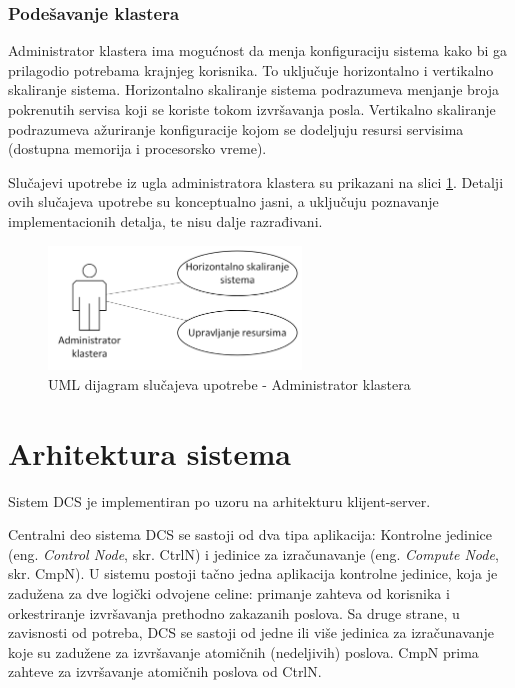 \documentclass[12pt,oneside]{memoir}
\begin{document}
\subsubsection{Podešavanje klastera}
Administrator klastera ima mogućnost da menja konfiguraciju sistema kako bi ga prilagodio potrebama krajnjeg korisnika. To uključuje horizontalno i vertikalno skaliranje sistema. Horizontalno skaliranje sistema podrazumeva menjanje broja pokrenutih servisa koji se koriste tokom izvršavanja posla. Vertikalno skaliranje podrazumeva ažuriranje konfiguracije kojom se dodeljuju resursi servisima (dostupna memorija i procesorsko vreme).

Slučajevi upotrebe iz ugla administratora klastera su prikazani na slici \ref{fig:slucajupotrebe_admin_klastera}. Detalji ovih slučajeva upotrebe su konceptualno jasni, a uključuju poznavanje implementacionih detalja, te nisu dalje razrađivani.

\begin{figure}[!ht]
  \centering
  \includegraphics[width=0.6\textwidth]{./images/dijagram_slucajeva_upotrebe_administrator_klastera.png}
  \caption{UML dijagram slučajeva upotrebe - Administrator klastera}
  \label{fig:slucajupotrebe_admin_klastera}
\end{figure}

\section{Arhitektura sistema}

Sistem DCS je implementiran po uzoru na arhitekturu klijent-server.

Centralni deo sistema DCS se sastoji od dva tipa aplikacija: Kontrolne jedinice (eng. \emph{Control Node}, skr. CtrlN) i jedinice za izračunavanje (eng. \emph{Compute Node}, skr. CmpN). 
U sistemu postoji tačno jedna aplikacija kontrolne jedinice, koja je zadužena za dve logički odvojene celine: primanje zahteva od korisnika i orkestriranje izvršavanja prethodno zakazanih poslova.
Sa druge strane, u zavisnosti od potreba, DCS se sastoji od jedne ili više jedinica za izračunavanje koje su zadužene za izvršavanje atomičnih (nedeljivih) poslova. CmpN prima zahteve za izvršavanje atomičnih poslova od CtrlN.
\end{document}
